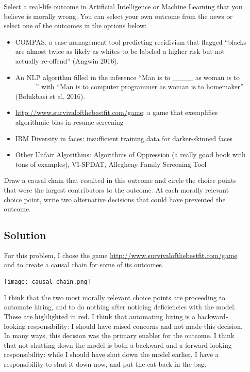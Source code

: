 \documentclass[submit]{harvardml}
\begin{document}
\begin{problem}

Select a real-life outcome in Artificial Intelligence or Machine Learning 
that you believe is morally wrong. You can select your own outcome from 
the news or select one of the outcomes in the options below:

\begin{itemize}
    \item COMPAS, a case management tool predicting recidivism that 
        flagged “blacks are almost twice as likely as whites to be 
        labeled a higher risk but not actually re-offend” (Angwin 
        2016).
        
    \item An NLP algorithm filled in the inference “Man is to 
        \_\_\_\_ as woman is to \_\_\_\_” with “Man is 
        to computer programmer as woman is to homemaker” (Bolukbasi 
        et al, 2016).
        
    \item \url{http://www.survivalofthebestfit.com/game}: a game that 
        exemplifies algorithmic bias in resume screening
        
    \item IBM Diversity in faces: insufficient training data for 
        darker-skinned faces
        
    \item Other Unfair Algorithms: Algorithms of Oppression (a really 
        good book with tons of examples), VI-SPDAT, Allegheny Family 
        Screening Tool
        
\end{itemize}
Draw a causal chain that resulted in this outcome and circle the choice points that were the largest contributors to the outcome. At each morally relevant choice point, write two alternative decisions that could have prevented the outcome.

\end{problem}

\newpage
\subsection*{Solution}
For this problem, I chose the game \url{http://www.survivalofthebestfit.com/game} and to create a causal chain for some of its outcomes.

\texttt{[image: causal-chain.png]}

I think that the two most morally relevant choice points are proceeding to automate hiring, and to do nothing after noticing deficiencies with the model. These are highlighted in red. I think that automating hiring is a backward-looking responsibility: I should have raised concerns and not made this decision. In many ways, this decision was the primary enabler for the outcome. I think that not shutting down the model is both a backward and a forward looking responsibility: while I should have shut down the model earlier, I have a responsibility to shut it down now, and put the cat back in the bag.
\end{document}
